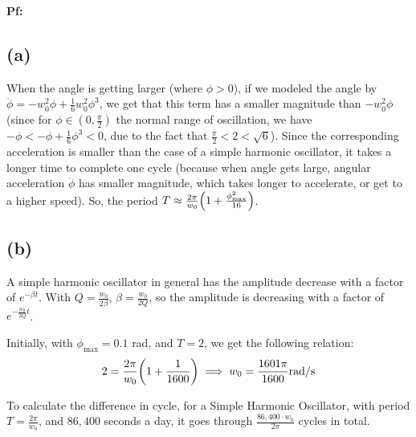 \documentclass{article}
\DeclarePairedDelimiter{\paran}{(}{)}%
\begin{document}
\textbf{Pf:}
\subsection*{(a)}
When the angle is getting larger (where $\phi>0$), if we modeled the angle by $\ddot\phi=-w_0^2\phi+\frac{1}{6}w_0^2\phi^3$, we get that this term has a smaller magnitude than $-w_0^2\phi$ (since for $\phi \in (0,\frac{\pi}{2})$ the normal range of oscillation, we have $-\phi<-\phi+\frac{1}{6}\phi^3<0$, due to the fact that $\frac{\pi}{2}<2<\sqrt{6}$). Since the corresponding acceleration is smaller than the case of a simple harmonic oscillator, it takes a longer time to complete one cycle (because when angle gets large, angular acceleration $\ddot \phi$ has smaller magnitude, which takes longer to accelerate, or get to a higher speed). So, the period $T\approx \frac{2\pi}{w_0}\paran*{1+\frac{\phi^2_{\max}}{16}}$.

\subsection*{(b)}
A simple harmonic oscillator in general has the amplitude decrease with a factor of $e^{-\beta t}$. With $Q=\frac{w_0}{2\beta}$, $\beta = \frac{w_0}{2Q}$, so the amplitude is decreasing with a factor of $e^{-\frac{w_0}{2Q}t}$.

Initially, with $\phi_{\max}=0.1$ rad, and $T=2$, we get the following relation:
\begin{equation}
    2 =  \frac{2\pi}{w_0}\paran*{1+\frac{1}{1600}}\implies w_0 = \frac{1601\pi}{1600}\textmd{rad/s}
\end{equation}

\hfil

To calculate the difference in cycle, for a Simple Harmonic Oscillator, with period $T=\frac{2\pi}{w_0}$, and $86,400$ seconds a day, it goes through $\frac{86,400 \cdot w_0}{2\pi}$ cycles in total.
\end{document}
